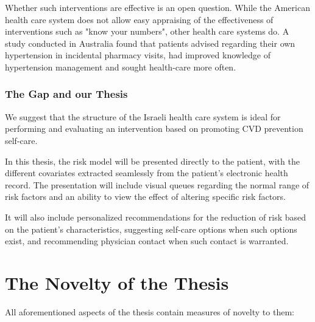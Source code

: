 \documentclass[a4paper,12pt]{article}
\begin{document}
			Whether such interventions are effective is an open question. While the American health care system does not allow easy appraising of the effectiveness of interventions such as "know your numbers", other health care systems do. A study conducted in Australia found that patients advised regarding their own hypertension in incidental pharmacy visits, had improved knowledge of hypertension management and sought health-care more often\cite{Cadilhac2015}.
			
			\subsubsection{The Gap and our Thesis}
			
			We suggest that the structure of the Israeli health care system is ideal for performing and evaluating an intervention based on promoting CVD prevention self-care.
			
			In this thesis, the risk model will be presented directly to the patient, with the different covariates extracted seamlessly from the patient's electronic health record. The presentation will include visual queues regarding the normal range of risk factors and an ability to view the effect of altering specific risk factors.
			
			It will also include personalized recommendations for the reduction of risk based on the patient's characteristics, suggesting self-care options when such options exist, and recommending physician contact when such contact is warranted.
	
	\section{The Novelty of the Thesis}
	
	All aforementioned aspects of the thesis contain measures of novelty to them:
	
\end{document}
